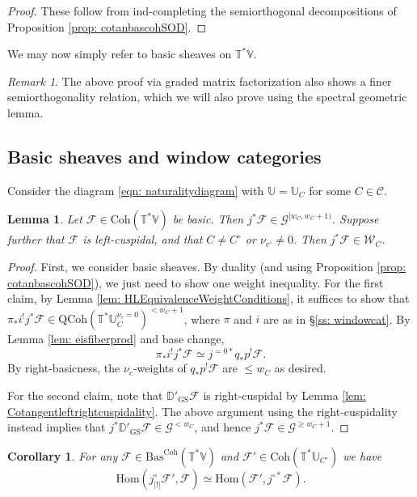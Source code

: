 \documentclass{amsart}
\newtheorem{lemma}[theorem]{Lemma}
\newtheorem{corollary}[theorem]{Corollary}
\theoremstyle{definition}
\theoremstyle{remark}
\newtheorem{remark}[theorem]{Remark}
\numberwithin{equation}{section}
\newcommand{\U}{\mathbb{U}}
\newcommand{\mc}{\mathcal}
\newcommand{\Hom}{\mathrm{Hom}}
\newcommand{\D}{\mathbb{D}}
\newcommand{\QCoh}{\mathrm{QCoh}}
\newcommand{\Coh}{\mathrm{Coh}}
\newcommand{\GS}{\mathrm{GS}}
\newcommand{\V}{\mathbb{V}}
\newcommand{\T}{\mathbb{T}}
\newcommand{\Bas}{\mathrm{Bas}}
\newcommand{\ush}{\lvert ! \rvert}
\begin{document}
\begin{proof}
These follow from ind-completing the semiorthogonal decompositions of Proposition \ref{prop: cotanbascohSOD}.
\end{proof}

We may now simply refer to basic sheaves on $\T^{\ast} \V$.


\begin{remark}
The above proof via graded matrix factorization also shows a finer  semiorthogonality relation, which we will also prove using the spectral geometric lemma. 
\end{remark}

\subsection{Basic sheaves and window categories}{\label{ss: basicvswindow}}
Consider the diagram \eqref{eqn: naturalitydiagram} with $\U = \U_C$ for some $C \in \mc{C}$.

\begin{lemma}{\label{lem: restriction lemma}}
Let $\mc{F} \in \Coh(\T^{\ast}\V)$ be basic. Then $j^{\ast} \mc{F} \in \mc{G}^{[w_C, w_C+1)}$. Suppose further that $\mc{F}$ is left-cuspidal, and that $C \neq C^{\circ}$ or $\nu_{c^{\circ}} \neq 0$. Then $j^{\ast} \mc{F} \in \mc{W}_C$.
\end{lemma}
\begin{proof}
 First, we consider basic sheaves. By duality (and using Proposition \ref{prop: cotanbascohSOD}), we just need to show one weight inequality. For the first claim, by Lemma \ref{lem: HLEquivalenceWeightConditions}, it suffices to show that $\pi_*i^{!}j^{\ast}\mc{F} \in \QCoh(\T^{\ast}\U_C^{\nu_c = 0})^{< w_C +1}$, where $\pi$ and $i$ are as in \S\ref{ss: windowcat}. By Lemma \ref{lem: eisfiberprod} and base change,
 \[
 \pi_*i^{!}j^{\ast}\mc{F} \simeq j^{=0*}q_* p^!\mc F.
 \]
 By right-basicness, the $\nu_c$-weights of $q_* p^!\mc F$ are $\leq w_C$ as desired. 

For the second claim, note that $\D'_\GS \mc F$ is right-cuspidal by Lemma \ref{lem: Cotangentleftrightcuspidality}. 
The above argument using the right-cuspidality instead implies that $j^* \D'_\GS \mc F\in \mc G^{< w_C}$, and hence $j^* \mc F\in \mc G^{\geq w_C +1}$. 
\end{proof}

\begin{corollary}{\label{cor: basadjunction}}
    For any $\mc{F} \in \Bas^{\Coh}(\T^{\ast}\V)$ and $\mc{F}' \in \Coh(\T^{\ast}\U_{C^{\circ}})$ we have
    \begin{equation*}
       \Hom(j^\circ_{\ush} \mc{F}' , \mc{F}) \simeq \Hom(\mc{F}', j^{\circ\ast} \mc{F}).
    \end{equation*}
\end{corollary}
\end{document}
